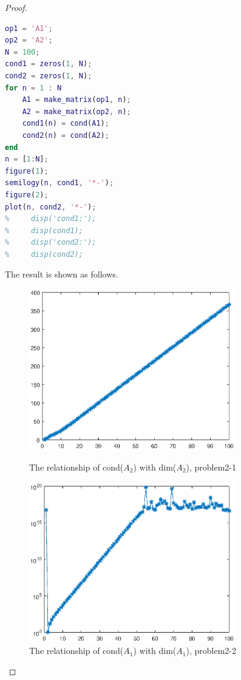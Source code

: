 \documentclass[12pt]{article}
\begin{document}
\begin{proof}
\begin{lstlisting}[language={MATLAB}]
op1 = 'A1';
op2 = 'A2';
N = 100;
cond1 = zeros(1, N);
cond2 = zeros(1, N);
for n = 1 : N
    A1 = make_matrix(op1, n);
    A2 = make_matrix(op2, n);
    cond1(n) = cond(A1);
    cond2(n) = cond(A2);
end
n = [1:N];
figure(1);
semilogy(n, cond1, '*-');
figure(2);
plot(n, cond2, '*-');
%     disp('cond1:');
%     disp(cond1);
%     disp('cond2:');
%     disp(cond2);
\end{lstlisting}
The result is shown as follows.
\begin{figure}[htbp]
\begin{minipage}[t]{0.5\linewidth}
\centering
\includegraphics[width=0.8\textwidth]{figure/problem2-1.eps}
\caption{The relationship of cond($A_2$) with dim($A_2$), problem2-1}
\label{Problem2-1}
\end{minipage}
\begin{minipage}[t]{0.5\linewidth}
\centering
\includegraphics[width=0.8\textwidth]{figure/problem2-2.eps}
\caption{The relationship of cond($A_1$) with dim($A_1$), problem2-2}
\label{Problem2-2}
\end{minipage}
\end{figure}
\end{proof}
\end{document}
